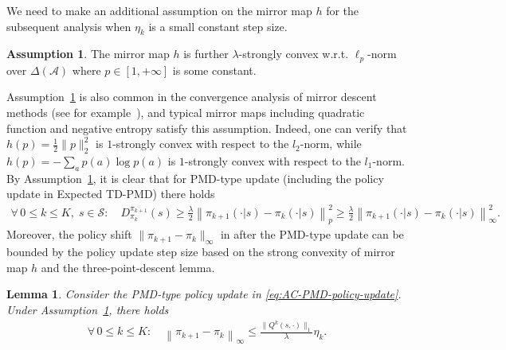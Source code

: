 \documentclass[10pt]{article}
\newcommand{\calA}{\mathcal{A}}
\newcommand{\calS}{\mathcal{S}}
\newcommand{\ls}{\left}
\newcommand{\rs}{\right}
\theoremstyle{plain}
\newtheorem{lemma}[theorem]{Lemma}
\theoremstyle{definition}
\newtheorem{assumption}[theorem]{Assumption}
\begin{document}
We need to make an additional assumption on the mirror map $h$ for the subsequent analysis when $\eta_k$ is a small constant step size. 
\begin{assumption}
    The mirror map $h$ is further $\lambda$-strongly convex w.r.t. $\ell_p$-norm over $\Delta(\calA)$ where $p \in [1,+\infty]$ is some constant.
    \label{ass:h}
\end{assumption}
\noindent Assumption~\ref{ass:h} is also common in the convergence analysis of mirror descent methods ({see for example~\citet[Chapter~9]{beck2017first}}), and typical mirror maps including quadratic function and negative entropy satisfy this assumption. Indeed, one can verify that  $h(p) = \frac{1}{2}\| p \|_2^2$ is $1$-strongly convex with respect to the $l_2$-norm, while  $h(p) = -\sum_{a} p(a) \log p(a)$ is $1$-strongly convex with respect to the $l_1$-norm. By Assumption~\ref{ass:h}, it is clear that for {PMD-type update (including the policy update in Expected TD-PMD)} there holds
\begin{align}
    \forall\, 0\leq k \leq K, \; s\in\calS: \quad D^{\pi_{k+1}}_{\pi_k}(s) \geq \frac{\lambda}{2} \ls\| \pi_{k+1}(\cdot|s) - \pi_k(\cdot|s) \rs\|_p^2 \geq \frac{\lambda}{2} \ls\| \pi_{k+1}(\cdot|s) - \pi_k(\cdot|s) \rs\|_\infty^2.
    \label{eq:Bregman-lower-bound}
\end{align}
Moreover, the policy  shift $\| \pi_{k+1} - \pi_k \|_\infty$ in {after the PMD-type  update} can be bounded by the policy update step size based on the strong convexity of mirror map $h$ and the three-point-descent lemma.
{
\begin{lemma}
    Consider the PMD-type policy update in \eqref{eq:AC-PMD-policy-update}.
    Under Assumption~\ref{ass:h}, there holds
    \begin{align*}
        \forall\, 0\leq k \leq K: \quad \ls\| \pi_{k+1} - \pi_k \rs\|_\infty \leq \frac{\| Q^k(s,\cdot) \|_1}{\lambda} \eta_k. 
    \end{align*}
    \label{lem:policy-shift}
\end{lemma}
}
\end{document}
